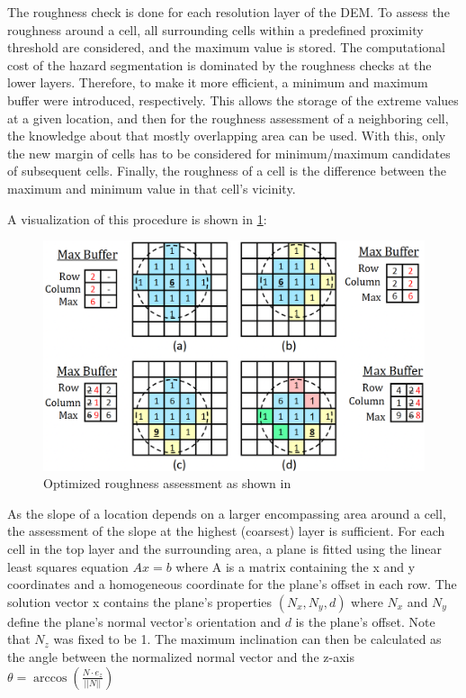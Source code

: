 \documentclass{article}
\begin{document}
The roughness check is done for each resolution layer of the DEM. To assess the roughness around a cell, all surrounding cells within a predefined proximity threshold are considered, and the maximum value is stored. The computational cost of the hazard segmentation is dominated by the roughness checks at the lower layers. Therefore, to make it more efficient, a minimum and maximum buffer were introduced, respectively. This allows the storage of the extreme values at a given location, and then for the roughness assessment of a neighboring cell, the knowledge about that mostly overlapping area can be used. With this, only the new margin of cells has to be considered for minimum/maximum candidates of subsequent cells. Finally, the roughness of a cell is the difference between the maximum and minimum value in that cell's vicinity.

A visualization of this procedure is shown in \cref{fig:lsd_roughness_check}:

\begin{figure}[ht!]
    \centering
    \includegraphics[scale=0.5]{images/system_overview/roughness_check.png}
    \caption{Optimized roughness assessment as shown in \citet{LSD2}}
    \label{fig:lsd_roughness_check}
\end{figure}

As the slope of a location depends on a larger encompassing area around a cell, the assessment of the slope at the highest (coarsest) layer is sufficient. For each cell in the top layer and the surrounding area, a plane is fitted using the linear least squares equation $Ax = b$ where A is a matrix containing the x and y coordinates and a homogeneous coordinate for the plane's offset in each row. The solution vector x contains the plane's properties $\left(N_x, N_y, d\right)$ where $N_x$ and $N_y$ define the plane's normal vector's orientation and $d$ is the plane's offset. Note that $N_z$ was fixed to be 1. The maximum inclination can then be calculated as the angle between the normalized normal vector and the z-axis $\theta = \arccos\left(\frac{N \cdot e_z}{||N||}\right)$
\end{document}
